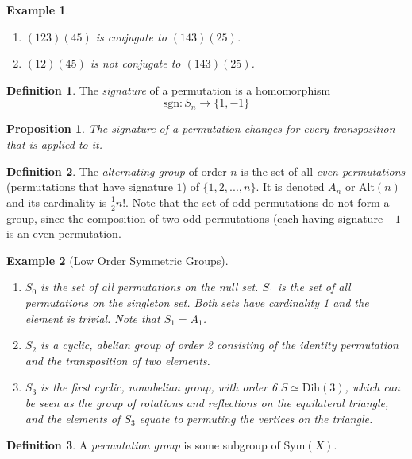 \documentclass{article}
\newtheorem{proposition}[theorem]{Proposition}
\newtheorem{example}{Example}[section]
\theoremstyle{remark}
\theoremstyle{definition}
\newtheorem{definition}{Definition}[section]
\begin{document}
\begin{example}
\begin{enumerate}
    \item $(1 2 3) (4 5)$ is conjugate to $(1 4 3) (2 5)$.
    \item $(1 2) (4 5)$ is not conjugate to $(1 4 3) (2 5)$. 
\end{enumerate}
\end{example}

\begin{definition}
The \textit{signature} of a permutation is a homomorphism
\[ \text{sgn}: S_{n} \longrightarrow \{1, -1\} \]
\end{definition}

\begin{proposition}
The signature of a permutation changes for every transposition that is applied to it. 
\end{proposition}

\begin{definition}
The \textit{alternating group} of order $n$ is the set of all \textit{even permutations} (permutations that have signature $1$) of $\{1, 2, ..., n\}$. It is denoted $A_{n}$ or Alt$(n)$ and its cardinality is $\frac{1}{2} n!$. Note that the set of odd permutations do not form a group, since the composition of two odd permutations (each having signature $-1$ is an even permutation. 
\end{definition}

\begin{example}[Low Order Symmetric Groups]
\begin{enumerate}
    \item $S_{0}$ is the set of all permutations on the \textit{null set}. $S_{1}$ is the set of all permutations on the \textit{singleton set}. Both sets have cardinality 1 and the element is \textit{trivial}. Note that $S_{1} = A_{1}$. 
    \item $S_{2}$ is a cyclic, abelian group of order 2 consisting of the identity permutation and the transposition of two elements. 
    \item $S_{3}$ is the first cyclic, nonabelian group, with order 6.$S \simeq \text{Dih}(3)$, which can be seen as the group of rotations and reflections on the equilateral triangle, and the elements of $S_{3}$ equate to permuting the vertices on the triangle. 
\end{enumerate}
\end{example}

\begin{definition}
A \textit{permutation group} is some subgroup of Sym$(X)$. 
\end{definition}
\end{document}
